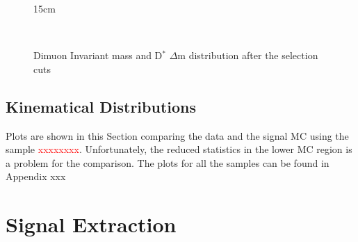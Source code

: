 \begin{figure}[!htm]{15cm}
  \caption{Dimuon Invariant mass and D$^*$ $\Delta$m distribution after the selection cuts}
  \label{fig:invmass_selection}
  \hfill
  \\
\end{figure}

\subsection{Kinematical Distributions}

Plots are shown in this Section comparing the data and the signal MC using the sample \textcolor{red}{xxxxxxxx}. Unfortunately, the reduced statistics in the lower MC region is a problem for the comparison. The plots for all the samples can be found in Appendix xxx

\section{Signal Extraction}\label{sec:sig_extraction}

